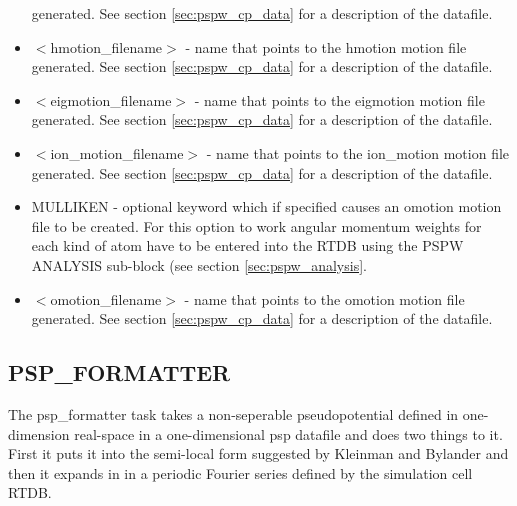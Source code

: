 \begin{itemize}
                                generated. See section \ref{sec:pspw_cp_data} for a 
                                description of the datafile.
        \item $<$hmotion\_filename$>$ - name that points to the hmotion motion file
                                generated. See section \ref{sec:pspw_cp_data} for a 
                                description of the datafile.
        \item $<$eigmotion\_filename$>$ - name that points to the eigmotion motion file
                                generated. See section \ref{sec:pspw_cp_data} for a 
                                description of the datafile.
        \item $<$ion\_motion\_filename$>$ - name that points to the ion\_motion motion file
                                generated. See section \ref{sec:pspw_cp_data} for a 
                                description of the datafile.
       \item MULLIKEN - optional keyword which if specified
                         causes an omotion motion file to be created.  For this option
                         to work angular momentum weights for each kind
                         of atom have to be entered into the RTDB using
                         the PSPW ANALYSIS sub-block (see section \ref{sec:pspw_analysis}.
        \item $<$omotion\_filename$>$ - name that points to the omotion motion file
                                generated. See section \ref{sec:pspw_cp_data} for a 
                                description of the datafile.
\end{itemize}



\subsection{PSP\_FORMATTER}
The psp\_formatter task takes a non-seperable pseudopotential defined in
one-dimension real-space in a one-dimensional psp datafile and does two 
things to it.  First it puts it into the semi-local form suggested by 
Kleinman and Bylander and then it expands in in a periodic Fourier
series defined by the simulation cell RTDB.  

